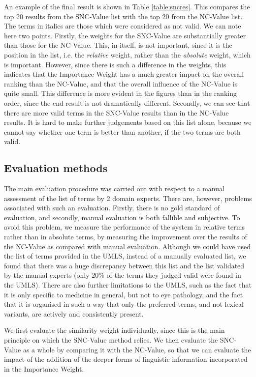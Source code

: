 An
example of the final result is shown in Table
\ref{table:sncres}. This compares the top 20 results from the
SNC-Value list with the top 20 from the NC-Value list. The terms in
italics are those which were considered as not valid. We
can note here two points. Firstly, the weights for the SNC-Value are
substantially greater than those for the NC-Value. This, in itself, is
not important, since it is the position in the list, i.e. the
{\it relative} weight, rather than the {\it absolute} weight,
which is important. However, since there is such a difference in the
weights, this indicates that the Importance Weight has a much greater
impact on the overall ranking than the NC-Value, and that the
overall influence of the NC-Value is quite small. This
difference is more evident in the figures than in the ranking order,
since the end result is not dramatically different. Secondly, we can see that there are more valid
terms in the SNC-Value results than in the NC-Value results. It is
hard to make further judgements based on this list alone, because we
cannot say whether one term is better than another, if the two terms
are both valid.

\subsection{Evaluation methods}

The main evaluation procedure was carried out with respect to a manual
assessment of the list of terms by 2 domain experts. There are,
however, problems associated with such an evaluation. Firstly, there
is no gold standard of evaluation, and secondly, manual evaluation is
both fallible and subjective. To avoid this problem, we measure the
performance of the system in relative terms rather than in absolute
terms, by measuring the improvement over the results of the NC-Value
as compared with manual evaluation. Although we could have used the
list of terms provided in the UMLS, instead of a manually evaluated
list, we found that there was a huge discrepancy between this list and
the list validated by the manual experts (only 20\% of the terms they judged
valid were found in the UMLS). There are also further limitations to
the UMLS, such as the fact that it is only specific to medicine in
general, but not to eye pathology, and the fact that it is organised
in such a way that only the preferred terms, and not lexical variants,
are actively and consistently present.

We first evaluate the similarity weight individually, since this is
the main principle on which the SNC-Value method relies.  We then
evaluate the SNC-Value as a whole by comparing it with the NC-Value,
so that we can evaluate the impact of the addition of the deeper forms
of linguistic information incorporated in the Importance Weight.

